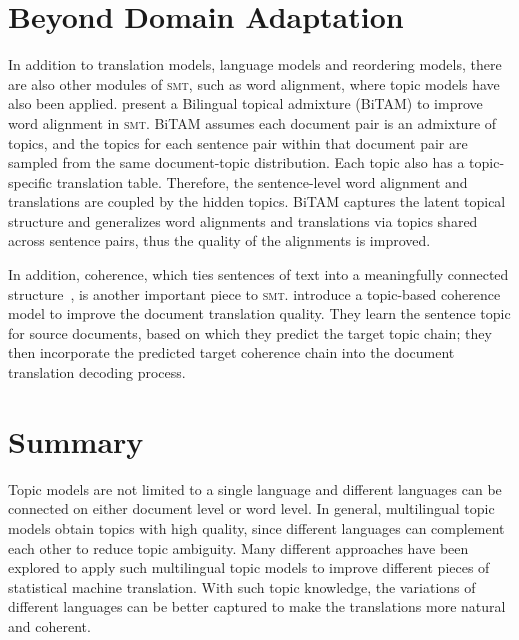 \section{Beyond Domain Adaptation}

In addition to translation models, language models and reordering models,
there are also other modules of \textsc{smt}, such as word alignment,
where topic models have also been applied. \citet{zhao-06} present a
Bilingual topical admixture (BiTAM) to improve  word
alignment in \textsc{smt}. BiTAM assumes each document pair is an
admixture of topics, and the topics for each sentence pair within that
document pair are sampled from the same document-topic
distribution. Each topic also has a topic-specific translation
table. Therefore, the sentence-level word alignment and translations
are coupled by the hidden topics.  BiTAM captures the latent
topical structure and generalizes word alignments and translations via
topics shared across sentence pairs, thus the quality of the
alignments is improved.

In addition, coherence, which ties sentences of text into a meaningfully
connected structure~\citep{xiong-13}, is another important piece to
\textsc{smt}. \citet{xiong-13} introduce a topic-based coherence model
to improve the document translation quality. They learn the sentence
topic for source documents, based on which they predict the target
topic chain; they then incorporate the predicted target coherence
chain into the document translation decoding process.

\section{Summary}

Topic models are not limited to a single language and different languages
can be connected on either document level or word level.
In general, multilingual topic models obtain topics with high quality,
since different languages can complement each other to reduce topic
ambiguity. Many different approaches have been explored to apply such
multilingual topic models to improve different pieces of statistical
machine translation. With such topic knowledge, the variations of
different languages can be better captured to make the translations
more natural and coherent.
